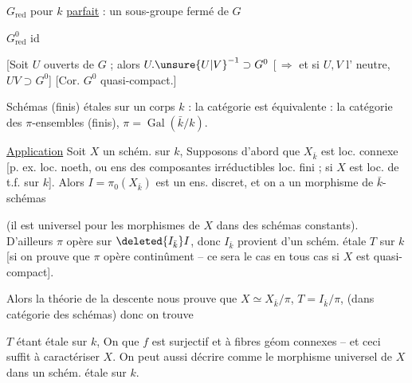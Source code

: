 $G_{\mathrm{red}}$ pour $k$ \uline{parfait} : un sous-groupe fermé de $G$

$G^{0}_{\mathrm{red}}$ id

[Soit $U$   ouverts de $G$ ; alors $U.\unsure{U|V}^{-1}\supset G^0$ [\,$\Rightarrow$ et si $U,V$  l' neutre, $UV\supset G^0$] [Cor. $G^0$ quasi-compact.]


Schémas (finis) étales sur un corps $k$ : la catégorie est équivalente : la catégorie des $\pi$-ensembles (finis), $\pi=\operatorname{Gal}(\bar k/k)$.

\uline{Application} Soit $X$ un schém. sur $k$, Supposons d'abord que $X_{\bar k}$ est loc. connexe [p. ex. loc. noeth, ou ens des composantes irréductibles loc. fini ;  si $X$ est loc. de t.f. sur $k$]. Alors $I=\pi_0(X_{\bar k})$ est un ens. discret, et on a un  morphisme de $\bar k$-schémas

(il est universel pour les morphismes de $X$ dans des schémas constants). D'ailleurs $\pi$ opère sur $\deleted{I_{\bar k}} I$, donc $I_{\bar k}$ provient d'un   schém. étale $T$ sur $k$ [si on prouve que $\pi$ opère continûment -- ce sera le cas en tous cas si $X$ est quasi-compact].


Alors la théorie de la descente nous prouve que $X\simeq X_{\bar k}/\pi$, $T=I_{\bar k}/\pi$, (dans catégorie des schémas) donc on trouve

$T$ étant étale sur $k$,  On  que $f$ est surjectif et à fibres géom connexes -- et ceci suffit à caractériser $X$. On peut aussi décrire comme le morphisme universel de $X$ dans un schém. étale sur $k$.

